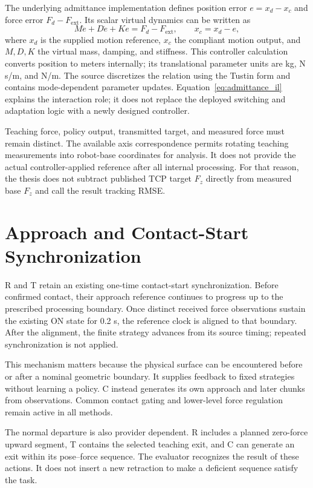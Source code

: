 The underlying admittance implementation defines position error \(e=x_d-x_c\) and force error \(F_d-F_{\mathrm{ext}}\). Its scalar virtual dynamics can be written as
\begin{equation}
 M\ddot e+D\dot e+Ke=F_d-F_{\mathrm{ext}},\qquad x_c=x_d-e,
 \label{eq:admittance_il}
\end{equation}
where \(x_d\) is the supplied motion reference, \(x_c\) the compliant motion output, and \(M,D,K\) the virtual mass, damping, and stiffness. This controller calculation converts position to meters internally; its translational parameter units are kg, N\,s/m, and N/m. The source discretizes the relation using the Tustin form and contains mode-dependent parameter updates. Equation~\eqref{eq:admittance_il} explains the interaction role; it does not replace the deployed switching and adaptation logic with a newly designed controller.

Teaching force, policy output, transmitted target, and measured force must remain distinct. The available axis correspondence permits rotating teaching measurements into robot-base coordinates for analysis. It does not provide the actual controller-applied reference after all internal processing. For that reason, the thesis does not subtract published TCP target \(F_z\) directly from measured base \(F_z\) and call the result tracking RMSE.

\section{Approach and Contact-Start Synchronization}
R and T retain an existing one-time contact-start synchronization. Before confirmed contact, their approach reference continues to progress up to the prescribed processing boundary. Once distinct received force observations sustain the existing ON state for 0.2 s, the reference clock is aligned to that boundary. After the alignment, the finite strategy advances from its source timing; repeated synchronization is not applied.

This mechanism matters because the physical surface can be encountered before or after a nominal geometric boundary. It supplies feedback to fixed strategies without learning a policy. C instead generates its own approach and later chunks from observations. Common contact gating and lower-level force regulation remain active in all methods.

The normal departure is also provider dependent. R includes a planned zero-force upward segment, T contains the selected teaching exit, and C can generate an exit within its pose--force sequence. The evaluator recognizes the result of these actions. It does not insert a new retraction to make a deficient sequence satisfy the task.

